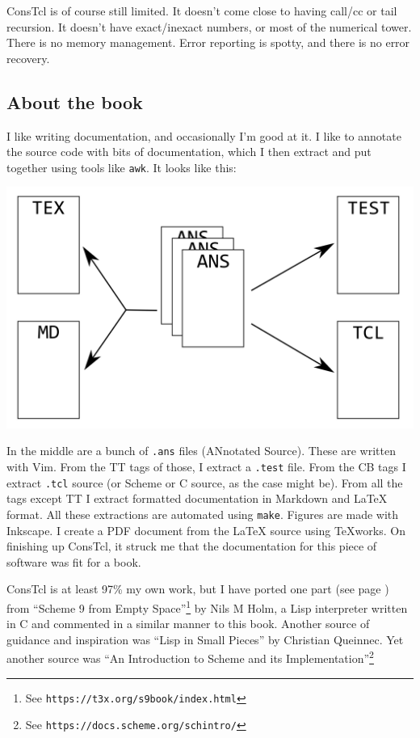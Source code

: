 \documentclass[twoside,9pt]{report}
\begin{document}
ConsTcl is of course still limited. It doesn't come close to having call/cc or
tail recursion. It doesn't have exact/inexact numbers, or most of the numerical
tower. There is no memory management. Error reporting is spotty, and there is no
error recovery.

\subsection{About the book}
\label{about-the-book}


I like writing documentation, and occasionally I'm good at it. I like to
annotate the source code with bits of documentation, which I then extract and
put together using tools like \texttt{awk}. It looks like this:

\includegraphics{images/document.png}

In the middle are a bunch of \texttt{.ans} files (ANnotated Source). These are
written with Vim. From the TT tags of those, I extract a \texttt{.test} file.
From the CB tags I extract \texttt{.tcl} source (or Scheme or C source, as the
case might be). From all the tags except TT I extract formatted documentation
in Markdown and \LaTeX{} format. All these extractions are automated using
\texttt{make}.  Figures are made with Inkscape.  I create a PDF document from
the \LaTeX{} source using TeXworks. On finishing up ConsTcl, it struck me that
the documentation for this piece of software was fit for a book.

ConsTcl is at least 97\% my own work, but I have ported one part (see page
\pageref{resolving-local-defines}) from ``Scheme 9 from Empty
Space''\footnote{See \texttt{https://t3x.org/s9book/index.html}} by Nils M
Holm, a Lisp interpreter written in C and commented in a
similar manner to this book. Another source of guidance and inspiration was
``Lisp in Small Pieces'' by Christian Queinnec. Yet another source was ``An
Introduction to Scheme and its Implementation''\footnote{See
\texttt{https://docs.scheme.org/schintro/}}
\end{document}
